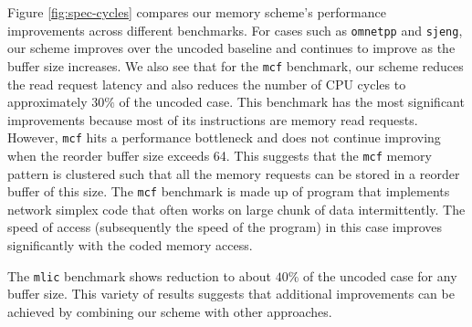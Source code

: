 Figure \ref{fig:spec-cycles} compares our memory scheme's performance improvements across different benchmarks. 
For cases such as \texttt{omnetpp} and \texttt{sjeng}, our scheme improves over the uncoded baseline and continues to improve as the buffer size increases.
We also see that for the \texttt{mcf} benchmark, our scheme reduces the read request latency and also reduces the number of CPU cycles to approximately $30\%$ of the uncoded case. This benchmark has the most significant improvements because most of its instructions are memory read requests. 
However, \texttt{mcf} hits a performance bottleneck and does not continue improving when the reorder buffer size exceeds 64. This suggests that the \texttt{mcf} memory pattern is clustered such that all the memory requests can be stored in a reorder buffer of this size. The \texttt{mcf} benchmark is made up of program that implements network simplex code that often works on large chunk of data intermittently\cite{mcf}. The speed of access (subsequently the speed of the program) in this case improves significantly with the coded memory access.

The \texttt{mlic} benchmark shows reduction to about $40\%$ of the uncoded case for any buffer size. This variety of results suggests that additional improvements can be achieved by combining our scheme with other approaches.





